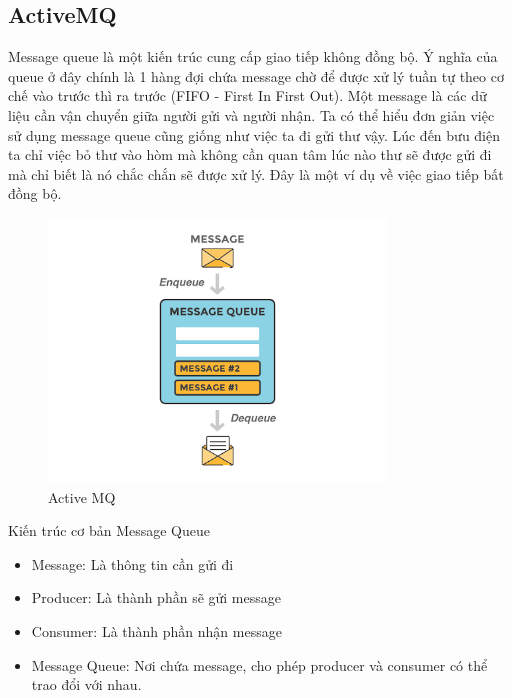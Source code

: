 \begin{itemize}
            \subsection{ActiveMQ}
            
            Message queue là một kiến trúc cung cấp giao tiếp không đồng bộ. Ý nghĩa của queue ở đây chính là 1 hàng đợi chứa message chờ để được xử lý tuần tự theo cơ chế vào trước thì ra trước (FIFO - First In First Out). Một message là các dữ liệu cần vận chuyển giữa người gửi và người nhận. Ta có thể hiểu đơn giản việc sử dụng message queue cũng giống như việc ta đi gửi thư vậy. Lúc đến bưu điện ta chỉ việc bỏ thư vào hòm mà không cần quan tâm lúc nào thư sẽ được gửi đi mà chỉ biết là nó chắc chắn sẽ được xử lý. Đây là một ví dụ về việc giao tiếp bất đồng bộ.
            
            \newpage
            
             \begin{figure}[!ht]   			\includegraphics[width=0.8\textwidth]{Images/message.png}
			\centering
			\linebreak
			\caption{Active MQ}
	        \end{figure}
		        
            Kiến trúc cơ bản Message Queue
            
            \begin{itemize}
                \item Message: Là thông tin cần gửi đi
                \item Producer: Là thành phần sẽ gửi message
                \item Consumer: Là thành phần nhận message
                \item Message Queue: Nơi chứa message, cho phép producer và consumer có thể trao đổi với nhau.
            \end{itemize}
            

\end{itemize}
